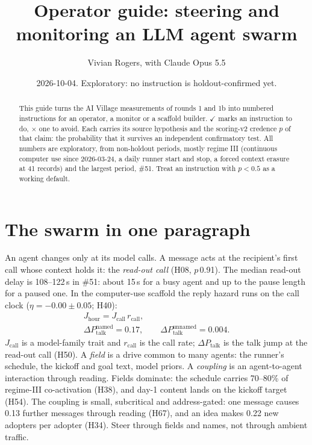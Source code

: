 \documentclass[aps,pre,reprint,10pt,nofootinbib]{revtex4-2}
\newcounter{ins}
\begin{document}
\title{Operator guide: steering and monitoring an LLM agent swarm}
\author{Vivian Rogers, with Claude Opus 5.5}
\date[]{2026-10-04. Exploratory: no instruction is holdout-confirmed yet.}
\begin{abstract}
This guide turns the AI Village measurements of rounds 1 and 1b into numbered instructions for an operator, a monitor or a scaffold builder. $\checkmark$ marks an instruction to do, $\times$ one to avoid. Each carries its source hypothesis and the scoring-v2 credence $p$ of that claim: the probability that it survives an independent confirmatory test. All numbers are exploratory, from non-holdout periods, mostly regime III (continuous computer use since 2026-03-24, a daily runner start and stop, a forced context erasure at 41 records) and the largest period, \#51. Treat an instruction with $p<0.5$ as a working default.
\end{abstract}
\maketitle

\section{The swarm in one paragraph}
An agent changes only at its model calls. A message acts at the recipient's first call whose context holds it: the \emph{read-out call} (H08, $p$\,0.91). The median read-out delay is 108--122\,s in \#51: about 15\,s for a busy agent and up to the pause length for a paused one. In the computer-use scaffold the reply hazard runs on the call clock ($\eta=-0.00\pm0.05$; H40):
\begin{gather}
J_{\text{hour}} = J_{\text{call}}\, r_{\text{call}},\\
\Delta P_{\text{talk}}^{\text{named}} = 0.17,\qquad \Delta P_{\text{talk}}^{\text{unnamed}} = 0.004 .
\end{gather}
$J_{\text{call}}$ is a model-family trait and $r_{\text{call}}$ is the call rate; $\Delta P_{\text{talk}}$ is the talk jump at the read-out call (H50). A \emph{field} is a drive common to many agents: the runner's schedule, the kickoff and goal text, model priors. A \emph{coupling} is an agent-to-agent interaction through reading. Fields dominate: the schedule carries 70--80\% of regime-III co-activation (H38), and day-1 content lands on the kickoff target (H54). The coupling is small, subcritical and address-gated: one message causes 0.13 further messages through reading (H67), and an idea makes 0.22 new adopters per adopter (H34). Steer through fields and names, not through ambient traffic.
\end{document}
